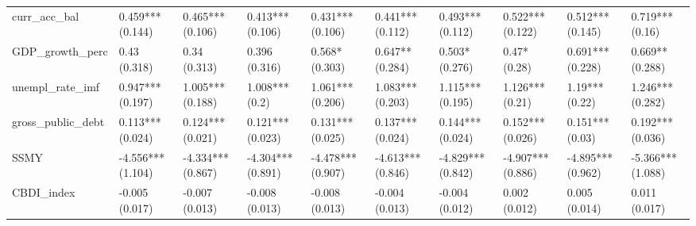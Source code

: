 \begin{table}[ht]
\begin{tabular}{llllllllll}
  curr\_acc\_bal & 0.459*** (0.144) & 0.465*** (0.106) & 0.413*** (0.106) & 0.431*** (0.106) & 0.441*** (0.112) & 0.493*** (0.112) & 0.522*** (0.122) & 0.512*** (0.145) & 0.719*** (0.16) \\ 
  GDP\_growth\_perc & 0.43 (0.318) & 0.34 (0.313) & 0.396 (0.316) & 0.568* (0.303) & 0.647** (0.284) & 0.503* (0.276) & 0.47* (0.28) & 0.691*** (0.228) & 0.669** (0.288) \\ 
  unempl\_rate\_imf & 0.947*** (0.197) & 1.005*** (0.188) & 1.008*** (0.2) & 1.061*** (0.206) & 1.083*** (0.203) & 1.115*** (0.195) & 1.126*** (0.21) & 1.19*** (0.22) & 1.246*** (0.282) \\ 
  gross\_public\_debt & 0.113*** (0.024) & 0.124*** (0.021) & 0.121*** (0.023) & 0.131*** (0.025) & 0.137*** (0.024) & 0.144*** (0.024) & 0.152*** (0.026) & 0.151*** (0.03) & 0.192*** (0.036) \\ 
  SSMY & -4.556*** (1.104) & -4.334*** (0.867) & -4.304*** (0.891) & -4.478*** (0.907) & -4.613*** (0.846) & -4.829*** (0.842) & -4.907*** (0.886) & -4.895*** (0.962) & -5.366*** (1.088) \\ 
  CBDI\_index & -0.005 (0.017) & -0.007 (0.013) & -0.008 (0.013) & -0.008 (0.013) & -0.004 (0.013) & -0.004 (0.012) & 0.002 (0.012) & 0.005 (0.014) & 0.011 (0.017) \\ 
   \bottomrule
\end{tabular}
\endgroup
\end{table}
